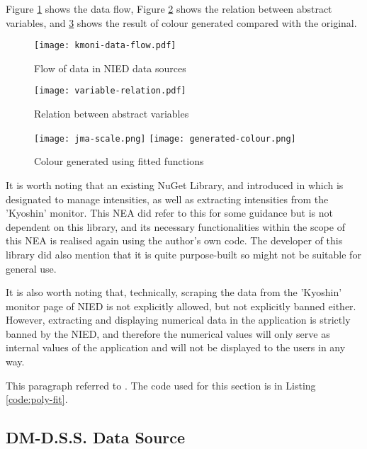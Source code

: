 Figure \ref{fig:kmoni-data-flow} shows the data flow, Figure \ref{fig:variable-relation} shows the relation between abstract variables, and \ref{fig:generated-colour} shows the result of colour generated compared with the original.

\begin{figure}[htp]
    \centering
    \texttt{[image: kmoni-data-flow.pdf]}
    \caption{Flow of data in NIED data sources}
    \label{fig:kmoni-data-flow}
\end{figure}

\begin{figure}[htp]
    \centering
    \texttt{[image: variable-relation.pdf]}
    \caption{Relation between abstract variables}
    \label{fig:variable-relation}
\end{figure}

\begin{figure}[htp]
    \centering
    \texttt{[image: jma-scale.png]}
    \texttt{[image: generated-colour.png]}
    \caption{Colour generated using fitted functions}
    \label{fig:generated-colour}
\end{figure}

It is worth noting that an existing NuGet Library,  and introduced in \autocite{blog-ingen-kmoni-nuget-lib} which is designated to manage intensities, as well as extracting intensities from the 'Kyoshin' monitor. This NEA did refer to this for some guidance but is not dependent on this library, and its necessary functionalities within the scope of this NEA is realised again using the author's own code. The developer of this library did also mention that it is quite purpose-built so might not be suitable for general use.

It is also worth noting that, technically, scraping the data from the 'Kyoshin' monitor page of NIED is not explicitly allowed, but not explicitly banned either. However, extracting and displaying numerical data in the application is strictly banned by the NIED, and therefore the numerical values will only serve as internal values of the application and will not be displayed to the users in any way.

This paragraph referred to \autocite{blog-jquake-poly-fit}. The code used for this section is in Listing \ref{code:poly-fit}.

\subsection{DM-D.S.S. Data Source}

